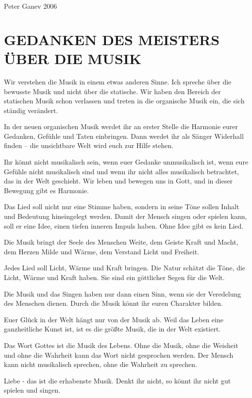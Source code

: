 \documentclass[11pt,a5paper,twoside]{article}
\begin{document}
\begin{flushright}
	Peter Ganev 2006
\end{flushright}


\section[Gedanken des Meisters über die Musik]{GEDANKEN DES MEISTERS ÜBER DIE MUSIK}

Wir verstehen die Musik in einem etwas anderen Sinne. Ich spreche über die bewusste Musik und nicht über die statische. Wir haben den Bereich der statischen Musik schon verlassen und treten in die organische Musik ein, die sich ständig verändert. 

In der neuen organischen Musik werdet ihr an erster Stelle die Harmonie eurer Gedanken, Gefühle und Taten einbringen. Dann werdet ihr als Sänger Widerhall finden – die unsichtbare Welt wird euch zur Hilfe stehen.

Ihr könnt nicht musikalisch sein, wenn euer Gedanke unmusikalisch ist, wenn eure Gefühle nicht musikalisch sind und wenn ihr nicht alles musikalisch betrachtet, das in der Welt geschieht. Wir leben und bewegen uns in Gott, und in dieser Bewegung gibt es Harmonie.

Das Lied soll nicht nur eine Stimme haben, sondern in seine Töne sollen Inhalt und Bedeutung hineingelegt werden. Damit der Mensch singen oder spielen kann, soll er eine Idee, einen tiefen inneren Impuls haben. Ohne Idee gibt es kein Lied.

Die Musik bringt der Seele des Menschen Weite, dem Geiste Kraft und Macht, dem Herzen Milde und Wärme, dem Verstand Licht und Freiheit.

Jedes Lied soll Licht, Wärme und Kraft bringen. Die Natur schätzt die Töne, die Licht, Wärme und Kraft haben. Sie sind ein göttlicher Segen für die Welt.

Die Musik und das Singen haben nur dann einen Sinn, wenn sie der Veredelung des Menschen dienen. Durch die Musik könnt ihr euren Charakter bilden.

Euer Glück in der Welt hängt nur von der Musik ab. Weil das Leben eine ganzheitliche Kunst ist, ist es die größte Musik, die in der Welt existiert. 

Das Wort Gottes ist die Musik des Lebens. Ohne die Musik, ohne die Weisheit und ohne die Wahrheit kann das Wort nicht gesprochen werden. Der Mensch kann nicht musikalisch sprechen, ohne die Wahrheit zu sprechen.

Liebe - das ist die erhabenste Musik. Denkt ihr nicht, so könnt ihr nicht gut spielen und singen.
\end{document}

